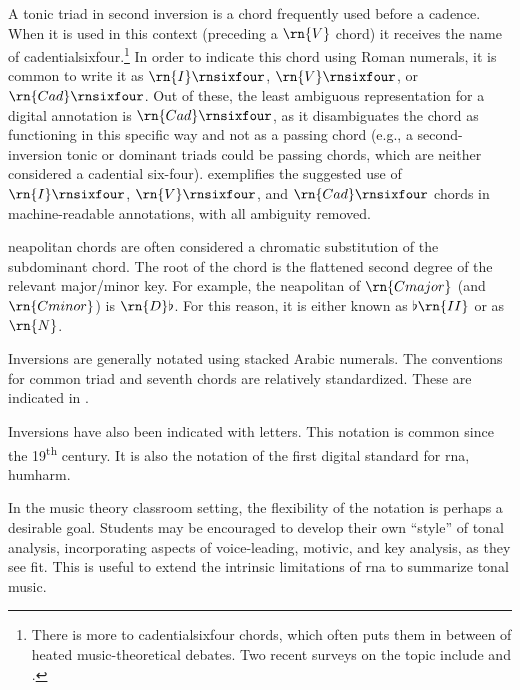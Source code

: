 A tonic triad in second inversion is a chord frequently used
before a cadence. When it is used in this context (preceding
a $\rn{V}$ chord) it receives the name of
\gls{cadentialsixfour}.\footnote{There is more to
\gls{cadentialsixfour} chords, which often puts them in
between of heated music-theoretical debates. Two recent
surveys on the topic include \textcite{mirka2015mystery} and
\textcite{ninov2016functional}.} In order to indicate this
chord using Roman numerals, it is common to write it as
$\rn{I}\rnsixfour$, $\rn{V}\rnsixfour$, or
$\rn{Cad}\rnsixfour$. Out of these, the least ambiguous
representation for a digital annotation is
$\rn{Cad}\rnsixfour$, as it disambiguates the chord as
functioning in this specific way and not as a passing chord
(e.g., a second-inversion tonic or dominant triads could be
passing chords, which are neither considered a cadential
six-four).  exemplifies the
suggested use of $\rn{I}\rnsixfour$, $\rn{V}\rnsixfour$, and
$\rn{Cad}\rnsixfour$ chords in machine-readable annotations,
with all ambiguity removed.


\gls{neapolitan} chords are often considered a chromatic
substitution of the subdominant chord. The root of the chord
is the flattened second degree of the relevant major/minor
key. For example, the \gls{neapolitan} of $\rn{C major}$
(and $\rn{C minor}$) is $\rn{D}\flat$. For this reason, it
is either known as $\flat\rn{II}$ or as $\rn{N}$.

Inversions are generally notated using stacked Arabic
numerals. The conventions for common triad and seventh
chords are relatively standardized. These are indicated in
.


Inversions have also been indicated with letters. This
notation is common since the 19\textsuperscript{th} century.
It is also the notation of the first digital standard for
\gls{rna}, \gls{humharm}.

In the music theory classroom setting, the flexibility of
the notation is perhaps a desirable goal. Students may be
encouraged to develop their own ``style'' of tonal analysis,
incorporating aspects of voice-leading, motivic, and key
analysis, as they see fit. This is useful to extend the
intrinsic limitations of \gls{rna} to summarize tonal music.

